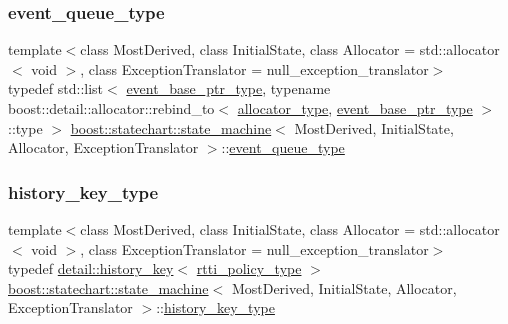 \subsubsection{\texorpdfstring{event\+\_\+queue\+\_\+type}{event\_queue\_type}}
{\footnotesize\ttfamily template$<$class Most\+Derived, class Initial\+State, class Allocator = std\+::allocator$<$ void $>$, class Exception\+Translator = null\+\_\+exception\+\_\+translator$>$ \\
typedef std\+::list$<$ \mbox{\hyperlink{classboost_1_1statechart_1_1state__machine_aa2f1c567e2d1a66786d28769312dfa08}{event\+\_\+base\+\_\+ptr\+\_\+type}}, typename boost\+::detail\+::allocator\+::rebind\+\_\+to$<$ \mbox{\hyperlink{classboost_1_1statechart_1_1state__machine_a7345d6567cd1a829234bbb7f6c0715da}{allocator\+\_\+type}}, \mbox{\hyperlink{classboost_1_1statechart_1_1state__machine_aa2f1c567e2d1a66786d28769312dfa08}{event\+\_\+base\+\_\+ptr\+\_\+type}} $>$\+::type $>$ \mbox{\hyperlink{classboost_1_1statechart_1_1state__machine}{boost\+::statechart\+::state\+\_\+machine}}$<$ Most\+Derived, Initial\+State, Allocator, Exception\+Translator $>$\+::\mbox{\hyperlink{classboost_1_1statechart_1_1state__machine_a308a12082f9cd10b95118871f01e94da}{event\+\_\+queue\+\_\+type}}\hspace{0.3cm}{\ttfamily [private]}}

\mbox{\label{classboost_1_1statechart_1_1state__machine_a4f8e1e85e0ba11488c57318b61950e32}} 
\subsubsection{\texorpdfstring{history\+\_\+key\+\_\+type}{history\_key\_type}}
{\footnotesize\ttfamily template$<$class Most\+Derived, class Initial\+State, class Allocator = std\+::allocator$<$ void $>$, class Exception\+Translator = null\+\_\+exception\+\_\+translator$>$ \\
typedef \mbox{\hyperlink{classboost_1_1statechart_1_1detail_1_1history__key}{detail\+::history\+\_\+key}}$<$ \mbox{\hyperlink{classboost_1_1statechart_1_1state__machine_af2a620c579a5248103aee4d3ccb4d632}{rtti\+\_\+policy\+\_\+type}} $>$ \mbox{\hyperlink{classboost_1_1statechart_1_1state__machine}{boost\+::statechart\+::state\+\_\+machine}}$<$ Most\+Derived, Initial\+State, Allocator, Exception\+Translator $>$\+::\mbox{\hyperlink{classboost_1_1statechart_1_1state__machine_a4f8e1e85e0ba11488c57318b61950e32}{history\+\_\+key\+\_\+type}}\hspace{0.3cm}{\ttfamily [private]}}

